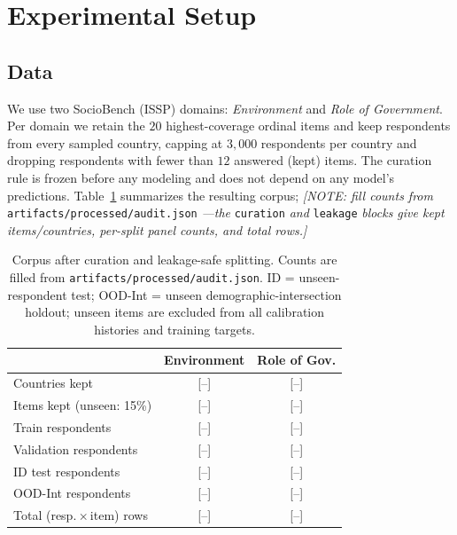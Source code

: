 \documentclass[letterpaper]{article} %
\begin{document}
\section{Experimental Setup}
\label{sec:setup}

\subsection{Data}
We use two SocioBench (ISSP) domains: \emph{Environment} and \emph{Role of
Government}. Per domain we retain the $20$ highest-coverage ordinal items and
keep respondents from every sampled country, capping at $3{,}000$ respondents
per country and dropping respondents with fewer than $12$ answered (kept)
items. The curation rule is frozen before any modeling and does not depend on
any model's predictions. Table~\ref{tab:data} summarizes the resulting corpus;
\emph{[NOTE: fill counts from} \texttt{artifacts/processed/audit.json}
\emph{---the} \texttt{curation} \emph{and} \texttt{leakage} \emph{blocks give
kept items/countries, per-split panel counts, and total rows.]}

\begin{table}[t]
\centering
\caption{Corpus after curation and leakage-safe splitting. Counts are filled
from \texttt{artifacts/processed/audit.json}. ID = unseen-respondent test;
OOD-Int = unseen demographic-intersection holdout; unseen items are excluded
from all calibration histories and training targets.}
\label{tab:data}
\begin{tabular}{lcc}
\toprule
 & Environment & Role of Gov. \\
\midrule
Countries kept              & [--] & [--] \\
Items kept (unseen: 15\%)   & [--] & [--] \\
Train respondents           & [--] & [--] \\
Validation respondents      & [--] & [--] \\
ID test respondents         & [--] & [--] \\
OOD-Int respondents         & [--] & [--] \\
Total (resp.\,$\times$\,item) rows & [--] & [--] \\
\bottomrule
\end{tabular}
\end{table}
\end{document}
